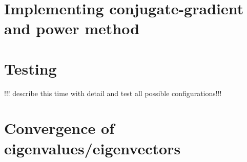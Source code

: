 \documentclass[11pt, letterpaper, onecolumn]{article}
\begin{document}
	
	
	\section{Implementing conjugate-gradient and power method}
	
	
	
	
	\section{Testing}
	!!! describe this time with detail and test all possible configurations!!!
	
	
	
	\section{Convergence of eigenvalues/eigenvectors}
\end{document}
